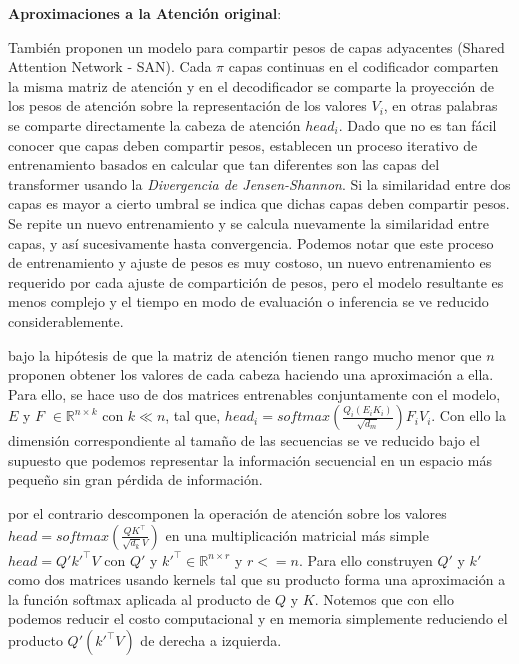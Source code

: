 \textbf{Aproximaciones a la Atención original}:

También \citeauthor{DBLP:journals/corr/abs-1906-11024} proponen un modelo para compartir pesos de capas
adyacentes (Shared Attention Network - SAN).
Cada $\pi$ capas continuas en el codificador comparten la misma matriz de atención y en el
decodificador se comparte la proyección de los pesos de atención sobre la representación de los
valores $V_i$, en otras palabras se comparte directamente la cabeza de atención $head_i$. Dado que no
es tan fácil conocer que capas deben compartir pesos, establecen un proceso iterativo
de entrenamiento basados en calcular que tan diferentes son las capas del transformer usando
la \textit{Divergencia de Jensen-Shannon}. Si la similaridad entre dos capas es mayor a cierto umbral
se indica que dichas capas deben compartir pesos. Se repite un nuevo entrenamiento y se calcula
nuevamente la similaridad entre capas, y así sucesivamente hasta convergencia. Podemos notar que este
proceso de entrenamiento y ajuste de pesos es muy costoso, un nuevo entrenamiento es requerido por
cada ajuste de compartición de pesos, pero el modelo resultante
es menos complejo y el tiempo en modo de evaluación o inferencia se ve reducido considerablemente.

\citeauthor{DBLP:journals/corr/abs-2006-04768} bajo la hipótesis de que la matriz de atención tienen
rango mucho menor que $n$ proponen obtener los valores de cada cabeza haciendo una aproximación a ella.
Para ello, se hace uso de dos matrices entrenables conjuntamente con el modelo, $E$ y $F$
$\in \mathbb{R}^{n \times k}$ con $k \ll n$, tal que,
$head_i = softmax(\frac{Q_i (E_i K_i)}{\sqrt{d_m}}) F_iV_i$. Con ello la dimensión correspondiente al
tamaño de las secuencias se ve reducido bajo el supuesto que podemos representar la información
secuencial en un espacio más pequeño sin gran pérdida de información.

\citeauthor{DBLP:journals/corr/abs-2009-14794} por el contrario descomponen la operación de atención
sobre los valores $head = softmax(\frac{QK^\top}{\sqrt{d_k} V})$ en una multiplicación matricial más simple
$head = Q'k'^\top V$ con $Q'$ y $k'^\top \in \mathbb{R}^{n \times r}$ y $r<=n$.
Para ello construyen $Q'$ y $k'$ como dos matrices usando kernels tal que su producto forma una
aproximación a la función softmax aplicada al producto de $Q$ y $K$. Notemos que con ello podemos
reducir el costo computacional y en
memoria simplemente reduciendo el producto $Q'(k'^\top V)$ de derecha a izquierda.

